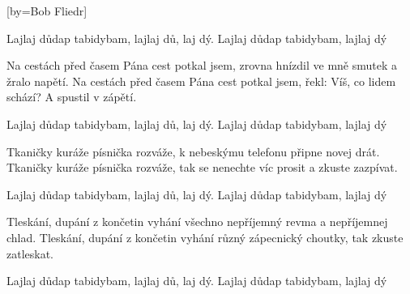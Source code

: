 [by={Bob Fliedr}]

\beginchorus{}
\lrep{} Lajlaj důdap tabidybam, lajlaj dů, laj dý.
Lajlaj důdap tabidybam, lajlaj dý \rrep{}
\endchorus{}

\beginverse{}
Na cestách před časem Pána cest potkal jsem,
zrovna hnízdil ve mně smutek a žralo napětí.
Na cestách před časem Pána cest potkal jsem,
řekl: Víš, co lidem schází? A spustil v zápětí.
\endverse{}

\repeatingchorus{}
\beginchorus{}
\chordsoff{}
\lrep{} Lajlaj důdap tabidybam, lajlaj dů, laj dý.
Lajlaj důdap tabidybam, lajlaj dý \rrep{}
\chordson{}
\endchorus{}

\beginverse{}
\chordsoff{}
Tkaničky kuráže písnička rozváže,
k nebeskýmu telefonu připne novej drát.
Tkaničky kuráže písnička rozváže,
tak se nenechte víc prosit a zkuste zazpívat.
\chordson{}
\endverse{}

\repeatingchorus{}
\beginchorus{}
\chordsoff{}
\lrep{} Lajlaj důdap tabidybam, lajlaj dů, laj dý.
Lajlaj důdap tabidybam, lajlaj dý \rrep{}
\chordson{}
\endchorus{}

\beginverse{}
\chordsoff{}
Tleskání, dupání z končetin vyhání
všechno nepříjemný revma a nepříjemnej chlad.
Tleskání, dupání z končetin vyhání
různý zápecnický choutky, tak zkuste zatleskat.
\chordson{}
\endverse{}

\repeatingchorus{}
\beginchorus{}
\chordsoff{}
\lrep{} Lajlaj důdap tabidybam, lajlaj dů, laj dý.
Lajlaj důdap tabidybam, lajlaj dý \rrep{}
\chordson{}
\endchorus{}

